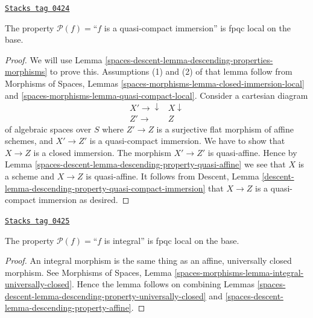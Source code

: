 \begin{lemma}
\label{spaces-descent-lemma-descending-property-quasi-compact-immersion}
\href{https://stacks.math.columbia.edu/tag/0424}{\texttt{Stacks tag 0424}}

The property $\mathcal{P}(f) =$``$f$ is a quasi-compact immersion''
is fpqc local on the base.
\end{lemma}

\begin{proof}
We will use
Lemma \ref{spaces-descent-lemma-descending-properties-morphisms}
to prove this. Assumptions (1) and (2) of that lemma follow from
Morphisms of Spaces,
Lemmas \ref{spaces-morphisms-lemma-closed-immersion-local} and
\ref{spaces-morphisms-lemma-quasi-compact-local}.
Consider a cartesian diagram
$$
\begin{array}{cc}X' \longrightarrow\downarrow & X \downarrow \\ Z' \longrightarrow & Z\end{array}
$$
of algebraic spaces over $S$
where $Z' \to Z$ is a surjective flat morphism of affine schemes,
and $X' \to Z'$ is a quasi-compact immersion. We have to show that $X \to Z$
is a closed immersion. The morphism $X' \to Z'$ is quasi-affine. Hence by
Lemma \ref{spaces-descent-lemma-descending-property-quasi-affine}
we see that $X$ is a scheme and $X \to Z$ is quasi-affine.
It follows from
Descent, Lemma \ref{descent-lemma-descending-property-quasi-compact-immersion}
that $X \to Z$ is a quasi-compact immersion as desired.
\end{proof}

\begin{lemma}
\label{spaces-descent-lemma-descending-property-integral}
\href{https://stacks.math.columbia.edu/tag/0425}{\texttt{Stacks tag 0425}}

The property $\mathcal{P}(f) =$``$f$ is integral''
is fpqc local on the base.
\end{lemma}

\begin{proof}
An integral morphism is the same thing as an affine,
universally closed morphism. See
Morphisms of Spaces,
Lemma \ref{spaces-morphisms-lemma-integral-universally-closed}.
Hence the lemma follows on combining
Lemmas \ref{spaces-descent-lemma-descending-property-universally-closed}
and \ref{spaces-descent-lemma-descending-property-affine}.
\end{proof}

